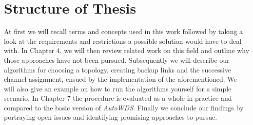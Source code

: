 \section{Structure of Thesis}
  At first we will recall terms and concepts used in this work followed by taking a look at the requirements and restrictions a possible solution would have to deal with.
  In Chapter 4, we will then review related work on this field and outline why those approaches have not been pursued.
  Subsequently we will describe our algorithms for choosing a topology, creating backup links and the successive channel assignment, 
  ensued by the implementation of the aforementioned. 
  We will also give an example on how to run the algorithms yourself for a simple scenario.
  In Chapter 7 the procedure is evaluated as a whole in practice and compared to the basic version of \textit{AutoWDS}.
  Finally we conclude our findings by portraying open issues and identifying promising approaches to pursue.
